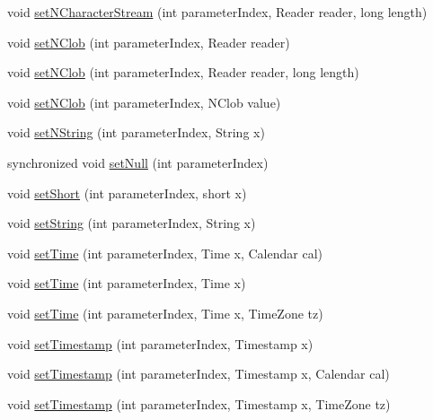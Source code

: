 \begin{DoxyCompactItemize}
void \mbox{\hyperlink{classcom_1_1mysql_1_1cj_1_1_client_prepared_query_bindings_a151f68913c4eceb8eb02b3b02c8a28cf}{set\+N\+Character\+Stream}} (int parameter\+Index, Reader reader, long length)
\item 
void \mbox{\hyperlink{classcom_1_1mysql_1_1cj_1_1_client_prepared_query_bindings_a042474c200f8ba611b9bb62ee46b0c72}{set\+N\+Clob}} (int parameter\+Index, Reader reader)
\item 
void \mbox{\hyperlink{classcom_1_1mysql_1_1cj_1_1_client_prepared_query_bindings_ae63f1680061ba971f2c7421aa424a012}{set\+N\+Clob}} (int parameter\+Index, Reader reader, long length)
\item 
void \mbox{\hyperlink{classcom_1_1mysql_1_1cj_1_1_client_prepared_query_bindings_a2ce7b7fc5dff1f2b5358c6a398983eba}{set\+N\+Clob}} (int parameter\+Index, N\+Clob value)
\item 
void \mbox{\hyperlink{classcom_1_1mysql_1_1cj_1_1_client_prepared_query_bindings_ab7971ac6e25778c7c66dca00d53519ef}{set\+N\+String}} (int parameter\+Index, String x)
\item 
synchronized void \mbox{\hyperlink{classcom_1_1mysql_1_1cj_1_1_client_prepared_query_bindings_a7ca86fab585cfe796d8e04dd7ba98130}{set\+Null}} (int parameter\+Index)
\item 
void \mbox{\hyperlink{classcom_1_1mysql_1_1cj_1_1_client_prepared_query_bindings_a54a24cb1bd8a5e56c7a2b1191bfa7007}{set\+Short}} (int parameter\+Index, short x)
\item 
void \mbox{\hyperlink{classcom_1_1mysql_1_1cj_1_1_client_prepared_query_bindings_a938490aeab6320d5eea6796e3f3abad7}{set\+String}} (int parameter\+Index, String x)
\item 
void \mbox{\hyperlink{classcom_1_1mysql_1_1cj_1_1_client_prepared_query_bindings_a066864b20490f3f8028436b2f7002b99}{set\+Time}} (int parameter\+Index, Time x, Calendar cal)
\item 
void \mbox{\hyperlink{classcom_1_1mysql_1_1cj_1_1_client_prepared_query_bindings_a72d6745a0f0273af09aaec3bfd48c57e}{set\+Time}} (int parameter\+Index, Time x)
\item 
void \mbox{\hyperlink{classcom_1_1mysql_1_1cj_1_1_client_prepared_query_bindings_a48d99d9c4b2ed3bb961fc23d86a5a418}{set\+Time}} (int parameter\+Index, Time x, Time\+Zone tz)
\item 
void \mbox{\hyperlink{classcom_1_1mysql_1_1cj_1_1_client_prepared_query_bindings_ab8fee5f764afbc751d115b974000275d}{set\+Timestamp}} (int parameter\+Index, Timestamp x)
\item 
void \mbox{\hyperlink{classcom_1_1mysql_1_1cj_1_1_client_prepared_query_bindings_acba8046c91819f57ff5360e08f0164df}{set\+Timestamp}} (int parameter\+Index, Timestamp x, Calendar cal)
\item 
void \mbox{\hyperlink{classcom_1_1mysql_1_1cj_1_1_client_prepared_query_bindings_a573aab742b0113b3eb75cce88952ffb4}{set\+Timestamp}} (int parameter\+Index, Timestamp x, Time\+Zone tz)
\end{DoxyCompactItemize}
